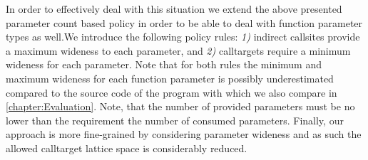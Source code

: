 In order to effectively deal with this situation we extend the above presented parameter count based policy in order to
be able to deal with function parameter types as well.We introduce the following policy rules: 
\textit{1)} indirect callsites provide a maximum wideness to each parameter, and
\textit{2)} calltargets require a minimum wideness for each parameter. 
Note that for both rules the minimum and maximum wideness for each function 
parameter is possibly underestimated compared to the source code of the program with which we 
also compare in \cref{chapter:Evaluation}.
Note, that the number of provided parameters must be no lower than the requirement the number of consumed parameters. 
Finally, our approach is more fine-grained by considering parameter wideness and as such the allowed calltarget lattice 
space is considerably reduced.



